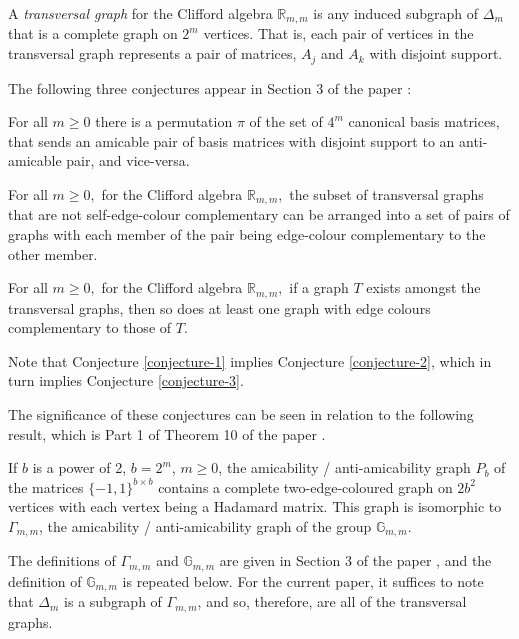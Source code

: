 \documentclass[11pt,a4paper]{jacodesmath}
\newcommand{\mb}[1]{\mathbb{#1}}
\newcommand{\G}{\mb{G}}
\newcommand{\R}{\mb{R}}
\begin{document}
A \emph{transversal graph} for the Clifford algebra $\R_{m,m}$
is any induced subgraph of $\varDelta_m$ that is a complete graph on $2^m$ vertices.
That is, each pair of vertices in the transversal graph represents a pair of matrices,
$A_j$ and $A_k$ with disjoint support.

The following three conjectures appear in Section 3 of the paper \cite{Leo14Constructions}:

\begin{conjecture}\label{conjecture-1}
%
For all $m \geqslant 0$ there is a permutation $\pi$ of the set of $4^m$ canonical basis matrices,
that sends an amicable pair of basis matrices with disjoint support to an anti-amicable pair, and
vice-versa.
%
\end{conjecture}

\begin{conjecture}\label{conjecture-2}
%
For all $m \geqslant 0,$
for the Clifford algebra $\R_{m,m},$ the subset of transversal graphs that are
not self-edge-colour complementary
can be arranged into a set of pairs of graphs with each member of the pair
being edge-colour complementary to the other member.
%
\end{conjecture}

\begin{conjecture}\label{conjecture-3}
%
For all $m \geqslant 0,$
for the Clifford algebra $\R_{m,m},$ if a graph $T$ exists amongst the transversal graphs,
then so does at least one graph with edge colours complementary to those of $T$.
%
\end{conjecture}
Note that Conjecture \ref{conjecture-1} implies  Conjecture \ref{conjecture-2},
which in turn implies Conjecture \ref{conjecture-3}.

The significance of these conjectures can be seen in relation to the following result,
which is Part 1 of Theorem 10 of the paper \cite{Leo14Constructions}.

\begin{lemma}\label{th-graph-image}
If $b$ is a power of 2, $b=2^m$, $m \geqslant 0$,
the amicability / anti-amicability graph $P_b$ of the matrices
$\{-1,1\}^{b \times b}$ contains a complete two-edge-coloured graph on $2 b^2$ vertices
with each vertex being a Hada\-mard matrix.
This graph is isomorphic to $\varGamma_{m,m}$, the amicability / anti-amicability graph of
the group $\G_{m,m}$.
\end{lemma}
The definitions of $\varGamma_{m,m}$ and $\G_{m,m}$
are given in Section 3 of the paper \cite{Leo14Constructions},
and the definition of $\G_{m,m}$ is repeated below.
For the current paper, it suffices to note that $\varDelta_m$ is a subgraph of $\varGamma_{m,m}$,
and so, therefore, are all of the transversal graphs.
\end{document}
